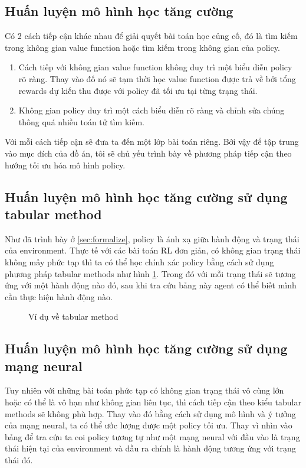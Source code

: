 \subsection{Huấn luyện mô hình học tăng cường}
Có 2 cách tiếp cận khác nhau để giải quyết bài toán học củng cố, đó là tìm kiếm trong không gian value function hoặc tìm kiếm trong không gian của policy. 
\begin{enumerate}
    \item Cách tiếp với không gian value function không duy trì một biểu diễn policy rõ ràng. Thay vào đố nó sẽ tạm thời học value function được trả về bởi tổng rewards dự kiến thu được với policy đã tối ưu tại từng trạng thái. 
    \item Không gian policy duy trì một cách biểu diễn rõ ràng và chỉnh sửa chúng thông quá nhiều toán tử tìm kiếm. 
\end{enumerate}
Với mỗi cách tiếp cận sẽ đưa ta đến một lớp bài toán riêng. Bởi vậy để tập trung vào mục đích của đồ án, tôi sẽ chủ yếu trình bày về phương pháp tiếp cận theo hướng tối ưu hóa mô hình policy.

\subsection{Huấn luyện mô hình học tăng cường sử dụng tabular method}
Như đã trình bày ở \ref{sec:formalize}, policy là ánh xạ giữa hành động và trạng thái của environment. Thực tế với các bài toán RL đơn giản, có không gian trạng thái không mấy phức tạp thì ta có thể học chính xác policy bằng cách sử dụng phương pháp tabular methods\cite{sutton1998introduction} như hình \ref{fig:problem:tabular}. Trong đó với mỗi trạng thái sẽ tương ứng với một hành động nào đó, sau khi tra cứu bảng này agent có thể biết mình cần thực hiện hành động nào.
\begin{figure}[ht]
    \centering
    \caption{Ví dụ về tabular method}
    \label{fig:problem:tabular}
\end{figure}
\subsection{Huấn luyện mô hình học tăng cường sử dụng mạng neural}
Tuy nhiên với những bài toán phức tạp có không gian trạng thái vô cùng lớn hoặc có thể là vô hạn như không gian liên tục, thì cách tiếp cận theo kiểu tabular methods sẽ không phù hợp. 
Thay vào đó bằng cách sử dụng mô hình và ý tưởng của mạng neural, ta có thể ước lượng được một policy tối ưu. Thay vì nhìn vào bảng để tra cứu ta coi policy tương tự như một mạng neural với đầu vào là trạng thái hiện tại của environment và đầu ra chính là hành động tương ứng với trạng thái đó. 

